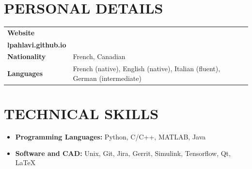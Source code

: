 \documentclass{ResumeTemplate}
\begin{document}
	

	\centering{}

	\subsubsection{~}

	\noindent\begin{minipage}[c]{0.75\linewidth} 
	
	\section{PERSONAL DETAILS}
	
	\noindent\begin{tabularx}{\linewidth}{>{\bfseries}lX}
	    Website & \href{https:\\lpahlavi.github.io}{lpahlavi.github.io} \\
	    Nationality & French, Canadian \\
	    Languages & French (native), English (native), Italian (fluent), German (intermediate) \\
	\end{tabularx}

	\section{TECHNICAL SKILLS}
	\raggedright
	\begin{itemize}[noitemsep, leftmargin=*]
		\item \textbf{Programming Languages:} Python, C/C++,  MATLAB, Java \\
		\item \textbf{Software and CAD:} Unix, Git, Jira, Gerrit, Simulink, Tensorflow, Qt, LaTeX
	\end{itemize}

	\end{minipage}
\end{document}
